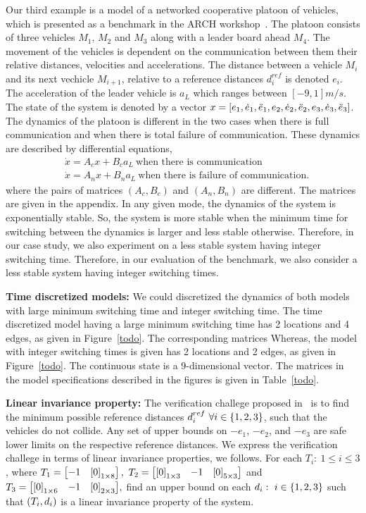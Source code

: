 Our third example is a model of a networked cooperative platoon of
vehicles, which is presented as a benchmark in the ARCH
workshop~\cite{makhlouf2014networked}.  The platoon consists of three
vehicles $M_1$, $M_2$ and $M_3$ along with a leader board ahead $M_4$.
The movement of the vehicles is dependent on the communication between
them their relative distances, velocities and accelerations.  The
distance between a vehicle $M_i$ and its next
vechicle $M_{i+1}$, relative to a reference distances $d_i^{ref}$ is
denoted $e_i$.  The acceleration of the leader vehicle is $a_L$ which
ranges between $[-9,1]m/s$.  The state of the system is denoted
by a vector
$x=\left[e_1,\dot{e}_1,\ddot{e}_1,e_2,\dot{e}_2,\ddot{e}_2,e_3,\dot{e}_3,\ddot{e}_3\right]$.
The dynamics of the platoon is different in the two cases when there
is full communication and when there is total failure of
communication.  These dynamics are described by differential equations,
%
\begin{align*}
& \dot{x}=A_cx+B_ca_L~\text{when there is communication}\\
& \dot{x}=A_nx+B_na_L~\text{when there is failure of communication}.
\end{align*}
%
where the pairs of matrices $(A_c,B_c)$ and $(A_n,B_n)$ are different.
The matrices are given in the appendix.  In any given mode, the
dynamics of the system is exponentially stable.  So, the system is
more stable when the minimum time for switching between the dynamics
is larger and less stable otherwise.  Therefore, in our case study, we
also experiment on a less stable system having integer switching time.
Therefore, in our evaluation of the benchmark, we also consider a less
stable system having integer switching times.

{\bf Time discretized models: } We could discretized the dynamics of
both models with large minimum switching time and integer switching
time.  The time discretized model having a large minimum switching
time has 2 locations and 4 edges, as given in Figure~\ref{todo}.  The
corresponding matrices Whereas, the model with integer switching times
is given has 2 locations and 2 edges, as given in Figure~\ref{todo}.
The continuous state is a 9-dimensional vector.  The matrices in the model
specifications described in the figures is given in Table~\ref{todo}.

{\bf Linear invariance property: } The verification challege proposed
in~\cite{makhlouf2014networked} is to find the minimum possible reference distances
$d_i^{ref}~\forall i\in\left\{1,2,3\right\}$, such that the vehicles do not
collide.  Any set of upper bounds on $-e_1$, $-e_2$, and $-e_3$ are
safe lower limits on the respective reference distances.  We express
the verification challege in terms of linear invariance properties, we
follows.  For each ${T_i:~1\leq
i\leq 3}$, where
%
$ T_1=\left[\begin{matrix}-1 & \left[0\right]_{1\times 8}\end{matrix}\right],~
T_2=\left[\begin{matrix}\left[0\right]_{1\times 3} & -1 &\left[0\right]_{5\times 3}\end{matrix}\right]$ and
 ${T_3=\left[\begin{matrix}\left[0\right]_{1\times 6}& -1 &\left[0\right]_{2\times 3}\end{matrix}\right]},
$
%
find an upper bound on each $d_i:~i\in\left\{1,2,3\right\}$ such that
$\left(T_i,d_i\right)$ is a linear invariance property of the system.
